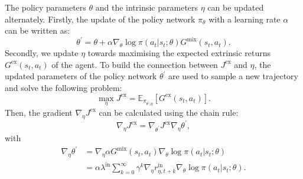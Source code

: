 
The policy parameters $\theta$ and the intrinsic parameters $\eta$ can be updated alternately.
Firstly, the update of the policy network $\pi_{\theta}$ with a learning rate $\alpha$ can be written as:
\begin{equation}
    \theta^{\prime}=\theta + \alpha\nabla_{\theta} \log \pi(a_t|s_t;\theta)G^{\text{mix}}(s_t, a_t).
\label{eq:mix_cost}
\end{equation}
Secondly, we update $\eta$ towards maximising the expected extrinsic returns $G^{\text{ex}}(s_t, a_t)$ of the agent. 
To build the connection between $J^{\text{ex}}$ and $\eta$, the updated parameters of the policy network $\theta^{\prime}$ are used to sample a new trajectory and solve the following problem:
\begin{equation}
    \max_{\eta} J^{\text{ex}} = \mathbb{E}_{\pi_{\theta^{\prime}|\eta}}[G^{\text{ex}}(s_t, a_t)].
\label{eq:cost_ex}
\end{equation}
Then, the gradient $\nabla_{\eta} J^{\text{ex}}$ can be calculated using the chain rule:
\begin{equation}
    \nabla_{\eta} J^{\text{ex}} = \nabla_{\theta^{\prime}}J^{\text{ex}}\nabla_{\eta}\theta^{\prime}, 
  \label{eq:chain_rule}
\end{equation}
with 
\begin{align}
    \nabla_{\eta}\theta^{\prime} &=  \nabla_{\eta}\alpha G^{\text{mix}}(s_t, a_t) \nabla_{\theta} \log \pi(a_t|s_t;\theta) \nonumber \\
    &= \alpha\lambda^{\text{in}}\sum_{k=0}^{\infty}\gamma^{k}\nabla_{\eta}r^{\text{in}}_{\eta,t+k}\nabla_{\theta} \log \pi(a_t|s_t;\theta). 
\end{align}

